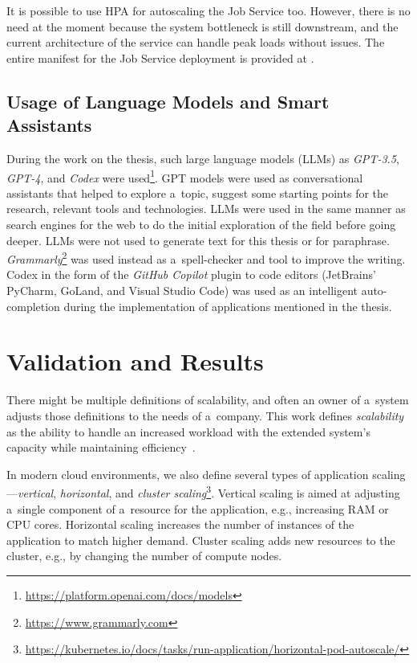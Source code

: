\documentclass[12pt]{article}
\begin{document}
It is possible to use HPA for autoscaling the Job Service too. However, there is no need at the moment because the system bottleneck is still downstream, and the current architecture of the service can handle peak loads without issues. The entire manifest for the Job Service deployment is provided at .

\subsection{Usage of Language Models and Smart Assistants} \label{ch:usage_language_models_smart_assistants}

During the work on the thesis, such large language models (LLMs) as \emph{GPT-3.5}, \emph{GPT-4}, and \emph{Codex} were used\footnote{\href{https://platform.openai.com/docs/models}{https://platform.openai.com/docs/models}}. GPT models were used as conversational assistants that helped to explore a~topic, suggest some starting points for the research, relevant tools and technologies. LLMs were used in the same manner as search engines for the web to do the initial exploration of the field before going deeper. LLMs were not used to generate text for this thesis or for paraphrase. \emph{Grammarly}\footnote{\href{https://www.grammarly.com}{https://www.grammarly.com}} was used instead as a~spell-checker and tool to improve the writing. Codex in the form of the \emph{GitHub Copilot} plugin to code editors (JetBrains' PyCharm, GoLand, and Visual Studio Code) was used as an intelligent auto-completion during the implementation of applications mentioned in the thesis.

\newpage
\section{Validation and Results} \label{ch:validation_and_testing}

There might be multiple definitions of scalability, and often an owner of a~system adjusts those definitions to the needs of a~company. This work defines \emph{scalability} as the ability to handle an increased workload with the extended system's capacity while maintaining efficiency~\cite{weinstock_system_2006}. 

In modern cloud environments, we also define several types of application scaling---\emph{vertical}, \emph{horizontal}, and \emph{cluster scaling}\footnote{\href{https://kubernetes.io/docs/tasks/run-application/horizontal-pod-autoscale/}{https://kubernetes.io/docs/tasks/run-application/horizontal-pod-autoscale/}}. Vertical scaling is aimed at adjusting a~single component of a~resource for the application, e.g., increasing RAM or CPU cores. Horizontal scaling increases the number of instances of the application to match higher demand. Cluster scaling adds new resources to the cluster, e.g., by changing the number of compute nodes. 
\end{document}
